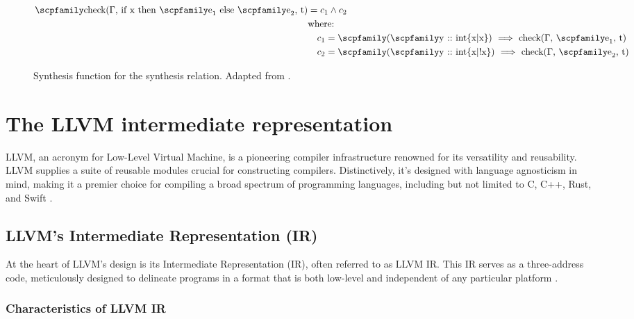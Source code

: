 \documentclass[
  oneside,
  english,
  coorientadorbanca,
  noabntexcite
]{ufsc-thesis-rn46-2019}
\newcommand{\code}[1]{\text{\scpfamily\setlength\spaceskip{0.35em}#1}}
\newcommand{\implcons}[3]{\code{$($\code{#1} $::$ #2$)$ $\implies$ #3}}
\begin{document}
\begin{figure}[ht]
\begin{align*}
    \code{check($\Gamma$, if x then $\code{e}_1$ else $\code{e}_2$, t)}
     & = c_1 \land c_2                                                         \\
     & \textrm{where:}                                                         \\
     & \quad c_1 = \implcons{y}{int\{x|x\}}{check($\Gamma$, $\code{e}_1$, t)}  \\
     & \quad c_2 = \implcons{y}{int\{x|!x\}}{check($\Gamma$, $\code{e}_2$, t)}
  \end{align*}
  \caption{
    Synthesis function for the synthesis relation.
    Adapted from \textcite{jhala2020tutorial}.
  }\label{fig:check_function_impl}
\end{figure}

\chapter{The LLVM intermediate representation}\label{ch:llvm}


LLVM, an acronym for Low-Level Virtual Machine, is a pioneering compiler infrastructure renowned for its versatility and reusability. LLVM supplies a suite of reusable modules crucial for constructing compilers. Distinctively, it's designed with language agnosticism in mind, making it a premier choice for compiling a broad spectrum of programming languages, including but not limited to C, C++, Rust, and Swift \cite{denisov2018mull}.

\section{LLVM's Intermediate Representation (IR)}

At the heart of LLVM's design is its Intermediate Representation (IR), often referred to as LLVM IR. This IR serves as a three-address code, meticulously designed to delineate programs in a format that is both low-level and independent of any particular platform \cite{lee2018reconciling}.

\subsection{Characteristics of LLVM IR}
\end{document}
